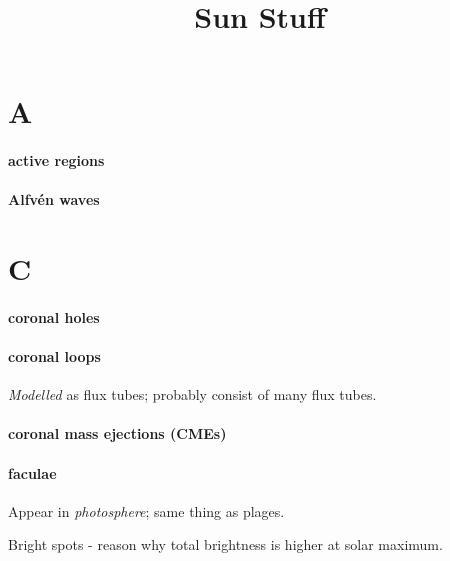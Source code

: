 \documentclass[12pt]{article}
\title{\vspace{-0.5in}Sun Stuff}
\author{}
\date{}
\begin{document}
\maketitle

\vspace{-1in}

\section*{A}

\paragraph{active regions}

\paragraph{Alfv\'en waves}

\section*{C}

\paragraph{coronal holes}

\paragraph{coronal loops}
\begin{itemize*}
    \item \emph{Modelled} as flux tubes; probably consist of
        many flux tubes.
\end{itemize*}

\paragraph{coronal mass ejections (CMEs)}

\paragraph{faculae}
    \begin{itemize*}
        \item Appear in \emph{photosphere}; same thing as plages.
        \item Bright spots - reason why total brightness is higher at
        solar maximum.
    \end{itemize*}
\end{document}
